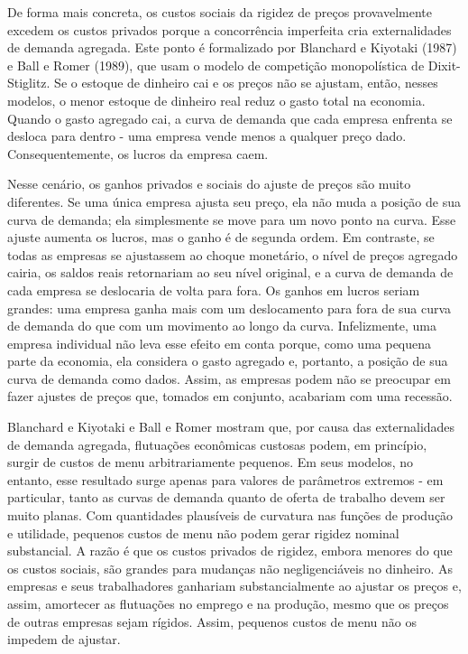 \documentclass[12pt]{article}
\begin{document}
De forma mais concreta, os custos sociais da rigidez de preços provavelmente excedem os custos privados porque a concorrência imperfeita cria externalidades de demanda agregada. Este ponto é formalizado por Blanchard e Kiyotaki (1987) e Ball e Romer (1989), que usam o modelo de competição monopolística de Dixit-Stiglitz. Se o estoque de dinheiro cai e os preços não se ajustam, então, nesses modelos, o menor estoque de dinheiro real reduz o gasto total na economia. Quando o gasto agregado cai, a curva de demanda que cada empresa enfrenta se desloca para dentro - uma empresa vende menos a qualquer preço dado. Consequentemente, os lucros da empresa caem.

Nesse cenário, os ganhos privados e sociais do ajuste de preços são muito diferentes. Se uma única empresa ajusta seu preço, ela não muda a posição de sua curva de demanda; ela simplesmente se move para um novo ponto na curva. Esse ajuste aumenta os lucros, mas o ganho é de segunda ordem. Em contraste, se todas as empresas se ajustassem ao choque monetário, o nível de preços agregado cairia, os saldos reais retornariam ao seu nível original, e a curva de demanda de cada empresa se deslocaria de volta para fora. Os ganhos em lucros seriam grandes: uma empresa ganha mais com um deslocamento para fora de sua curva de demanda do que com um movimento ao longo da curva. Infelizmente, uma empresa individual não leva esse efeito em conta porque, como uma pequena parte da economia, ela considera o gasto agregado e, portanto, a posição de sua curva de demanda como dados. Assim, as empresas podem não se preocupar em fazer ajustes de preços que, tomados em conjunto, acabariam com uma recessão.

Blanchard e Kiyotaki e Ball e Romer mostram que, por causa das externalidades de demanda agregada, flutuações econômicas custosas podem, em princípio, surgir de custos de menu arbitrariamente pequenos. Em seus modelos, no entanto, esse resultado surge apenas para valores de parâmetros extremos - em particular, tanto as curvas de demanda quanto de oferta de trabalho devem ser muito planas. Com quantidades plausíveis de curvatura nas funções de produção e utilidade, pequenos custos de menu não podem gerar rigidez nominal substancial. A razão é que os custos privados de rigidez, embora menores do que os custos sociais, são grandes para mudanças não negligenciáveis no dinheiro. As empresas e seus trabalhadores ganhariam substancialmente ao ajustar os preços e, assim, amortecer as flutuações no emprego e na produção, mesmo que os preços de outras empresas sejam rígidos. Assim, pequenos custos de menu não os impedem de ajustar.
\end{document}
